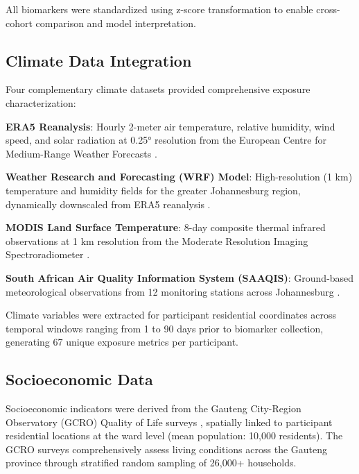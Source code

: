 \documentclass[journal,article,submit,pdftex,moreauthors]{Definitions/mdpi}
\begin{document}
All biomarkers were standardized using z-score transformation to enable cross-cohort comparison and model interpretation.

\subsection{Climate Data Integration}

Four complementary climate datasets provided comprehensive exposure characterization:

\textbf{ERA5 Reanalysis}: Hourly 2-meter air temperature, relative humidity, wind speed, and solar radiation at 0.25° resolution from the European Centre for Medium-Range Weather Forecasts \cite{hersbach2020era5}.

\textbf{Weather Research and Forecasting (WRF) Model}: High-resolution (1 km) temperature and humidity fields for the greater Johannesburg region, dynamically downscaled from ERA5 reanalysis \cite{skamarock2008description}.

\textbf{MODIS Land Surface Temperature}: 8-day composite thermal infrared observations at 1 km resolution from the Moderate Resolution Imaging Spectroradiometer \cite{wan2015modis}.

\textbf{South African Air Quality Information System (SAAQIS)}: Ground-based meteorological observations from 12 monitoring stations across Johannesburg \cite{saaqis2021data}.

Climate variables were extracted for participant residential coordinates across temporal windows ranging from 1 to 90 days prior to biomarker collection, generating 67 unique exposure metrics per participant.

\subsection{Socioeconomic Data}

Socioeconomic indicators were derived from the Gauteng City-Region Observatory (GCRO) Quality of Life surveys \cite{gcro2016quality,gcro2019quality}, spatially linked to participant residential locations at the ward level (mean population: 10,000 residents). The GCRO surveys comprehensively assess living conditions across the Gauteng province through stratified random sampling of 26,000+ households.
\end{document}
